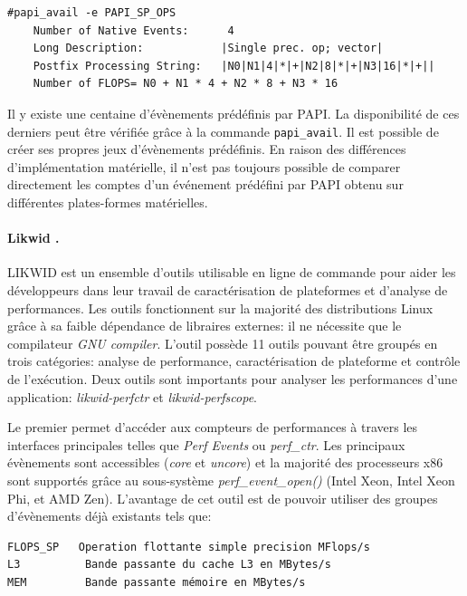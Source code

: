 \begin{verbatim}
#papi_avail -e PAPI_SP_OPS
    Number of Native Events:      4
    Long Description:            |Single prec. op; vector|
    Postfix Processing String:   |N0|N1|4|*|+|N2|8|*|+|N3|16|*|+||
    Number of FLOPS= N0 + N1 * 4 + N2 * 8 + N3 * 16
\end{verbatim}

            Il y existe une centaine d'évènements prédéfinis par PAPI. La disponibilité de ces derniers peut être vérifiée grâce à la commande \verb|papi_avail|. Il est possible de créer ses propres jeux d'évènements prédéfinis. En raison des différences d'implémentation matérielle, il n'est pas toujours possible de comparer directement les comptes d'un événement prédéfini par PAPI obtenu sur différentes plates-formes matérielles.

        \paragraph{Likwid \cite{Treibig2010}.}
        
            LIKWID est un ensemble d'outils utilisable en ligne de commande pour aider les développeurs dans leur travail de caractérisation de plateformes et d'analyse de performances. Les outils fonctionnent sur la majorité des distributions Linux grâce à sa faible dépendance de libraires externes: il ne nécessite que le compilateur \textit{GNU compiler}. L'outil possède 11 outils pouvant être groupés en trois catégories: analyse de performance, caractérisation de plateforme et contrôle de l'exécution. Deux outils sont importants pour analyser les performances d'une application: \textit{likwid-perfctr} et \textit{likwid-perfscope}.
        
            Le premier permet d'accéder aux compteurs de performances à travers les interfaces principales telles que \textit{Perf Events} ou \textit{perf\_ctr}. Les principaux évènements sont accessibles (\textit{core} et \textit{uncore}) et la majorité des processeurs x86 sont supportés grâce au sous-système \textit{perf\_event\_open()} (Intel Xeon, Intel Xeon Phi, et AMD Zen). L'avantage de cet outil est de pouvoir utiliser des groupes d'évènements déjà existants tels que:

\begin{lstlisting}
FLOPS_SP   Operation flottante simple precision MFlops/s
L3          Bande passante du cache L3 en MBytes/s
MEM         Bande passante mémoire en MBytes/s
\end{lstlisting}


